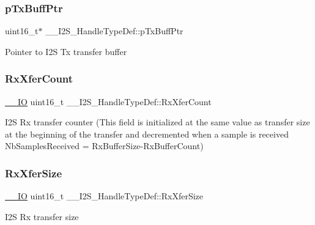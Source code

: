 \subsubsection{\texorpdfstring{p\+Tx\+Buff\+Ptr}{pTxBuffPtr}}
{\footnotesize\ttfamily uint16\+\_\+t$\ast$ \+\_\+\+\_\+\+I2\+S\+\_\+\+Handle\+Type\+Def\+::p\+Tx\+Buff\+Ptr}

Pointer to I2S Tx transfer buffer \mbox{\label{struct_____i2_s___handle_type_def_a0bc678555f31c1de9a784b86181c0000}} 
\subsubsection{\texorpdfstring{Rx\+Xfer\+Count}{RxXferCount}}
{\footnotesize\ttfamily \hyperlink{core__sc300_8h_aec43007d9998a0a0e01faede4133d6be}{\+\_\+\+\_\+\+IO} uint16\+\_\+t \+\_\+\+\_\+\+I2\+S\+\_\+\+Handle\+Type\+Def\+::\+Rx\+Xfer\+Count}

I2S Rx transfer counter (This field is initialized at the same value as transfer size at the beginning of the transfer and decremented when a sample is received Nb\+Samples\+Received = Rx\+Buffer\+Size-\/\+Rx\+Buffer\+Count) \mbox{\label{struct_____i2_s___handle_type_def_a48cd9c3dd7e96293dc4e65f4ab0b47e7}} 
\subsubsection{\texorpdfstring{Rx\+Xfer\+Size}{RxXferSize}}
{\footnotesize\ttfamily \hyperlink{core__sc300_8h_aec43007d9998a0a0e01faede4133d6be}{\+\_\+\+\_\+\+IO} uint16\+\_\+t \+\_\+\+\_\+\+I2\+S\+\_\+\+Handle\+Type\+Def\+::\+Rx\+Xfer\+Size}

I2S Rx transfer size \mbox{\label{struct_____i2_s___handle_type_def_aee7a449f3c7fab6129898b32e0f29c0c}} 
